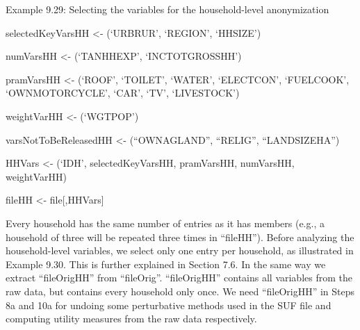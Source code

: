 \documentclass[letterpaper,10pt,english]{sphinxmanual}
\begin{document}
Example 9.29: Selecting the variables for the household-level
anonymization

\begin{DUlineblock}{0em}
\item[] 
\item[] selectedKeyVarsHH \textless{}- (‘URBRUR’, ‘REGION’, ‘HHSIZE’)
\item[] 
\item[] numVarsHH \textless{}- (‘TANHHEXP’, ‘INCTOTGROSSHH’)
\item[] 
\item[] pramVarsHH \textless{}- (‘ROOF’, ‘TOILET’, ‘WATER’, ‘ELECTCON’,
‘FUELCOOK’, ‘OWNMOTORCYCLE’, ‘CAR’, ‘TV’, ‘LIVESTOCK’)
\item[] 
\item[] weightVarHH \textless{}- (‘WGTPOP’)
\item[] 
\item[] varsNotToBeReleasedHH \textless{}- (“OWNAGLAND”, “RELIG”, “LANDSIZEHA”)
\item[] 
\item[] HHVars \textless{}- (‘IDH’, selectedKeyVarsHH, pramVarsHH, numVarsHH,
weightVarHH)
\end{DUlineblock}

\begin{DUlineblock}{0em}
\item[] 
\item[] fileHH \textless{}- file{[},HHVars{]}
\end{DUlineblock}

Every household has the same number of entries as it has members (e.g.,
a household of three will be repeated three times in “fileHH”). Before
analyzing the household-level variables, we select only one entry per
household, as illustrated in Example 9.30. This is further explained in
Section 7.6. In the same way we extract “fileOrigHH” from “fileOrig”.
“fileOrigHH” contains all variables from the raw data, but contains
every household only once. We need “fileOrigHH” in Steps 8a and 10a for
undoing some perturbative methods used in the SUF file and computing
utility measures from the raw data respectively.
\end{document}
